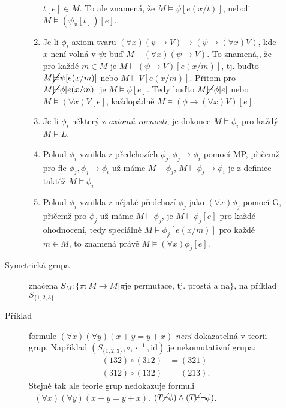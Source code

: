 \documentclass[a4paper]{article}
\begin{document}
\begin{description}
\begin{description}
\begin{enumerate}
							$t[e] \in M$. To ale znamená, že $M \models \psi[e(x/t)]$,
							neboli $M \models (\psi_x[t])[e]$.
						\item Je-li $\phi_i$ axiom tvaru
							$(\forall x)(\psi \to V) \to (\psi \to (\forall x)V)$,
							kde $x$ není volná v $\psi$: buď $M \models (\forall x)(\psi \to V)$.
							To znamená,, že pro každé $m \in M$ je
							$M \models (\psi \to V)[e(x/m)]$, tj. buďto
							$M \cancel{\models} \psi[e(x/m)]$ nebo $M \models V[e(x/m)]$.
							Přitom pro $M \cancel{\models} \phi[e(x/m)]$ je $M \models \phi[e]$.
							Tedy buďto  $M \cancel{\models} \phi[e]$ nebo $M \models (\forall x)V[e]$,
							každopádně $M \models (\phi \to (\forall x)V)[e]$.
						\item Je-li $\phi_i$ některý z \textit{axiomů rovnosti}, je dokonce
							$M \models \phi_i$ pro každý $M \models L$.
						\item Pokud $\phi_i$ vznikla z předchozích $\phi_j, \phi_j \to \phi_i$ pomocí
							MP, přičemž pro fle $\phi_j, \phi_j \to \phi_i$ už máme $M \models \phi_j$,
							$M \models \phi_j \to \phi_i$ je z definice taktéž $M \models \phi_i$ 
						\item Pokud $\phi_i$ vznikla z nějaké předchozí $\phi_j$ jako $(\forall x)\phi_j$ 
							pomocí G, přičemž pro $\phi_j$ už máme $M \models \phi_j$, je
							$M \models \phi_j[e]$ pro každé ohodnocení, tedy speciálně
							$M \models \phi_j[e(x/m)]$ pro každé $m \in M$, to znamená
							právě $M \models (\forall x) \phi_j[e]$.
					\end{enumerate}
				\item[Symetrická grupa] značena $S_M : \{\pi : M \to M | \pi \text{
					je permutace, tj. prostá a na}\}$, na příklad $S_{\{1, 2, 3\}}$
				\item[Příklad] formule $(\forall x)(\forall y)(x + y = y + x)$ \textit{není} dokazatelná
					v teorii grup. Například $(S_{\{1, 2, 3\}}, \circ, \cdot^{-1}, \text{id})$
					je nekomutativní grupa: \begin{align*}
						(1 3 2) \circ (3 1 2) &= (3 2 1) \\
						(3 1 2) \circ (1 3 2) &= (2 1 3)
					.\end{align*}
					Stejně tak ale teorie grup nedokazuje formuli
					$\neg (\forall x)(\forall y)(x + y = y + x)$.
					$(T \cancel{\vdash} \phi) \land (T \cancel{\vdash} \neg \phi)$.
			\end{description}
	\end{description}
\end{document}
